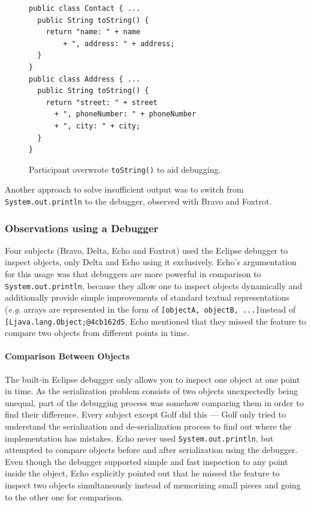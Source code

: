 \documentclass[english]{scrartcl}
\newcommand{\eg}{\emph{e.g.}\xspace}
\newcommand{\println}{\texttt{Sys\-tem.\-out.\-println}\xspace}
\begin{document}
\begin{figure}[h]
\begin{lstlisting}
public class Contact { ...
  public String toString() {
	return "name: " + name
		+ ", address: " + address;
  }
}
public class Address { ...
  public String toString() {
	return "street: " + street
	  + ", phoneNumber: " + phoneNumber
	  + ", city: " + city;
  }
}
\end{lstlisting}
  \caption{Participant overwrote \texttt{toString()} to aid debugging.}
\end{figure}

Another approach to solve insufficient output was to switch from \println to the debugger, observed with Bravo and Foxtrot.

\subsubsection{Observations using a Debugger}
Four subjects (Bravo, Delta, Echo and Foxtrot) used the Eclipse debugger to inspect objects, only Delta and Echo using it exclusively. 
Echo's argumentation for this usage was that debuggers are more powerful in comparison to \println, because they allow one to inspect objects dynamically and additionally provide simple improvements of standard textual representations (\eg arrays are represented in the form of \texttt{[objectA, objectB, ...]}instead of \texttt{[Ljava.lang.Object;@4cb162d5}.
Echo mentioned that they missed the feature to compare two objects from different points in time.

\paragraph{Comparison Between Objects}
The built-in Eclipse debugger only allows you to inspect one object at one point in time. 
As the serialization problem consists of two objects unexpectedly  being unequal, part of the debugging process was somehow comparing them in order to find their difference. 
Every subject except Golf did this --- Golf only tried to understand the serialization and de-serialization process to find out where the implementation has mistakes. 
Echo never used \println, but attempted to compare objects before and after serialization using the debugger. 
Even though the debugger supported simple and fast inspection to any point inside the object, Echo explicitly pointed out that he missed the feature to inspect two objects simultaneously instead of memorizing small pieces and going to the other one for comparison.
\end{document}
